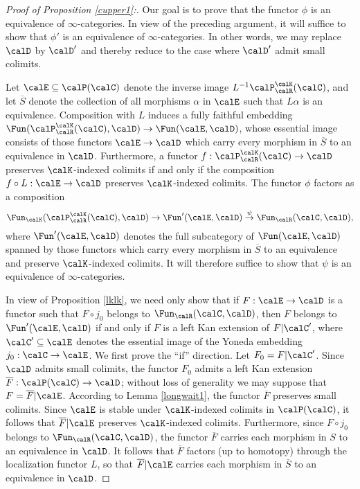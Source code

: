 \begin{proof}[Proof of Proposition \ref{cupper1}:]
Our goal is to prove that the functor $\phi$ is an equivalence of $\infty$-categories. In view of the preceding argument, it will suffice to show that $\phi'$ is an equivalence of $\infty$-categories. In other words, we may replace $\calD$ by $\calD'$ and thereby reduce to the case where
$\calD'$ admit small colimits.

Let $\calE \subseteq \calP(\calC)$ denote the inverse image
$L^{-1} \calP^{\calK}_{\calR}(\calC)$, and let $\overline{S}$ denote the collection of all
morphisms $\alpha$ in $\calE$ such that $L\alpha$ is an equivalence. Composition with
$L$ induces a fully faithful embedding $\Fun( \calP^{\calK}_{\calR}(\calC), \calD) \rightarrow
\Fun( \calE, \calD)$, whose essential image consists of those functors $\calE \rightarrow \calD$
which carry every morphism in $\overline{S}$ to an equivalence in $\calD$. Furthermore, a functor
$f: \calP^{\calK}_{\calR}(\calC) \rightarrow \calD$ preserves $\calK$-indexed colimits if and only if the
composition $f \circ L: \calE \rightarrow \calD$ preserves $\calK$-indexed colimits. The functor $\phi$ factors as a composition
$$ \Fun_{\calK}( \calP^{\calK}_{\calR}(\calC), \calD) \rightarrow \Fun'( \calE, \calD)
\stackrel{\psi}{\rightarrow} \Fun_{\calR}(\calC, \calD),$$
where $\Fun'(\calE, \calD)$ denotes the full subcategory of $\Fun( \calE, \calD)$ spanned by those functors which carry every morphism in $\overline{S}$ to an equivalence and preserve $\calK$-indexed colimits. It will therefore suffice to show that $\psi$ is an equivalence of $\infty$-categories.

In view of Proposition \ref{lklk}, we need only show that if $F: \calE \rightarrow \calD$ is a functor such that $F \circ j_0$ belongs to $\Fun_{\calR}(\calC, \calD)$, then $F$ belongs to
$\Fun'(\calE, \calD)$ if and only if $F$ is a left Kan extension of $F | \calC'$, where
$\calC' \subseteq \calE$ denotes the essential image of the Yoneda embedding $j_0: \calC \rightarrow
\calE$. We first prove the ``if'' direction. Let $F_0 = F | \calC'$. Since $\calD$ admits small colimits, the
functor $F_0$ admits a left Kan extension $\overline{F}: \calP(\calC) \rightarrow \calD$; without loss of generality we may suppose that $F = \overline{F} | \calE$. According to Lemma \ref{longwait1}, 
the functor $\overline{F}$ preserves small colimits. Since $\calE$ is stable under $\calK$-indexed colimits in $\calP(\calC)$, it follows that $\overline{F} | \calE$ preserves $\calK$-indexed colimits.
Furthermore, since $F \circ j_0$ belongs to $\Fun_{\calR}(\calC, \calD)$, the functor
$\overline{F}$ carries each morphism in $S$ to an equivalence in $\calD$. It follows that
$\overline{F}$ factors (up to homotopy) through the localization functor $L$, so that
$\overline{F} | \calE$ carries each morphism in $\overline{S}$ to an equivalence in $\calD$.


\end{proof}
